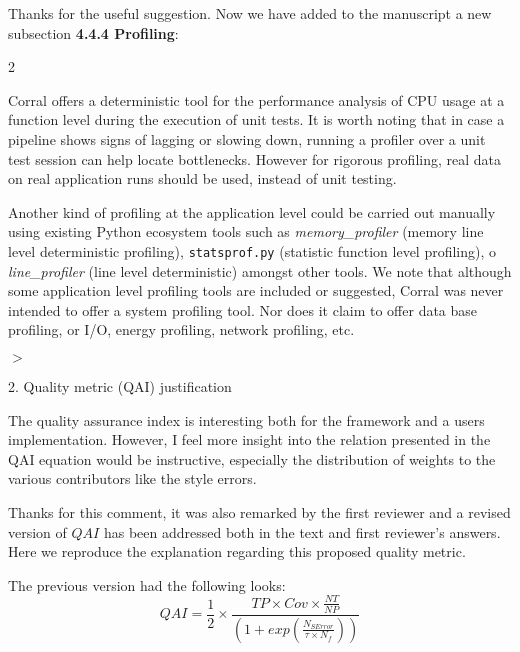 \documentclass[a4paper,onecolumn,fleqn,usenatbib,useAMS]{mnrasr}
\newenvironment{frshaded}{%
\def\FrameCommand{\fboxrule=\FrameRule\fboxsep=\FrameSep \fcolorbox{framecolor}{shadecolor}}%
\MakeFramed {\FrameRestore}}%
{\endMakeFramed}
\newenvironment{myindentpar}[1]%
 {\begin{list}{}%
         \bigskip
         \color{refereecolor}
         {\setlength{\leftmargin}{#1}}%
         \itshape
         \item[$>$]%
 }
 {\end{list}}
\begin{document}
%
Thanks for the useful suggestion. Now we have added to the manuscript
a new subsection \textbf{4.4.4 Profiling}:

\begin{frshaded}
\begin{multicols}{2} 
   
Corral offers a deterministic tool for the performance analysis
of CPU usage at a function level 
during the execution of unit tests.
%
It is worth noting that in case a pipeline shows signs of lagging or
slowing down, running a profiler over a unit test session can help locate bottlenecks.
However for rigorous profiling, real data on real application runs should
be used, instead of unit testing.
%

Another kind of profiling at the application level could be carried out
manually using existing Python ecosystem tools such as 
\textit{memory\_profiler}
(memory line level deterministic profiling),
\verb|statsprof.py|
(statistic function level profiling), o
\textit{line\_profiler}
(line level deterministic) amongst other tools.
%
We note that although some application level profiling tools are included 
or suggested, Corral was never intended to offer a system profiling tool. 
%
Nor does it claim to offer data base profiling, or I/O, energy profiling, network profiling, etc.

\end{multicols} \end{frshaded} 

\begin{myindentpar}{1cm}
2. Quality metric (QAI) justification

The quality assurance index is interesting both for the framework and
a users implementation. However, I feel more insight into the relation
presented in the QAI equation would be instructive, especially the
distribution of weights to the various contributors like the style
errors.
 
\end{myindentpar}

%
Thanks for this comment, it was also remarked by the first reviewer and
a revised version of $QAI$ has been addressed both in the text and 
first reviewer's answers. Here we reproduce the explanation regarding
this proposed quality metric.

The previous version had the following looks:
\begin{displaymath}
 QAI = \frac{1}{2} \times \frac{ TP \times Cov \times \frac{NT}{NP}}
                               {\left( 1 + exp \left( \frac{N_{SError}}{\tau \times N_f} \right)\right)} 
\end{displaymath}
\end{document}
